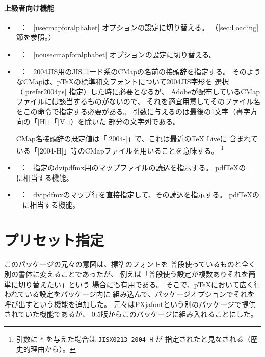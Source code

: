 \documentclass[a4paper,uplatex]{jsarticle}
\newcommand{\Pkg}[1]{\textsf{#1}}
\newcommand{\Meta}[1]{$\langle$\mbox{}#1\mbox{}$\rangle$}
\newcommand{\Means}{：\ }
\providecommand{\pTeX}{p\TeX}
\begin{document}
\paragraph{上級者向け機能}
\begin{itemize}
\item |\usecmapforalphabet|\Means
  |usecmapforalphabet| オプションの設定に切り替える。
  （\ref{sec:Loading}節を参照。）
\item |\nousecmapforalphabet|\Means
  |nousecmapforalphabet| オプションの設定に切り替える。
\item |\setnewglyphcmapprefix{|\Meta{文字列}|}|\Means
  2004JIS用のJISコード系のCMapの名前の接頭辞を指定する。
  そのようなCMapは、{\pTeX}の標準和文フォントについて2004JIS字形を
  選択（|prefer2004jis| 指定）した時に必要となるが、
  Adobeが配布しているCMapファイルには該当するものがないので、
  それを適宜用意してそのファイル名をこの命令で指定する必要がある。
  引数に与えるのは最後の1文字（書字方向の「|H|」「|V|」）を除いた
  部分の文字列である。\par
  CMap名接頭辞の既定値は「|2004-|」で、これは最近のTeX Liveに
  含まれている「|2004-H|」等のCMapファイルを用いることを意味する。%
  \inhibitglue\footnote{%
    引数に \texttt{*} を与えた場合は \texttt{JISX0213-2004-H} が
    指定されたと見なされる（歴史的理由から）。}
\item |\usefontmapfile{|\Meta{マップファイル名}|}|\Means
  指定のdvipdfmx用のマップファイルの読込を指示する。
  pdf{\TeX}の |\pdfmapfile| に相当する機能。
\item |\usefontmapline{|\Meta{マップ行}|}|\Means
  dvipdfmxのマップ行を直接指定して、その読込を指示する。
  pdf{\TeX}の |\pdfmapline| に相当する機能。
\end{itemize}

\section{プリセット指定}
\label{sec:Preset}

このパッケージの元々の意図は、標準のフォントを
普段使っているものと全く別の書体に変えることであったが、
例えば「普段使う設定が複数ありそれを簡単に切り替えたい」という
場合にも有用である。
そこで、{\pTeX}において広く行われている設定をパッケージ内に
組み込んで、パッケージオプションでそれを呼び出すという機能を追加した。
元々は\Pkg{PXjafont}という別のパッケージで提供されていた機能であるが、
0.5版からこのパッケージに組み入れることにした。
\end{document}
